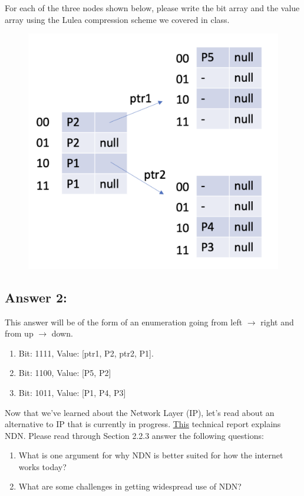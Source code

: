 \documentclass[10pt]{article}
\newenvironment{problem}[2][Problem]{\begin{trivlist}
\item[\hskip \labelsep {\bfseries #1}\hskip \labelsep {\bfseries #2.}]}{\end{trivlist}}
\begin{document}
\begin{problem} {2: Lulea Compression}

For each of the three nodes shown below, please write the bit array and the value array using the Lulea compression scheme we covered in class.

\begin{figure}[h]
    \centering
    \includegraphics[scale=0.5]{figures/trie_nodes.pdf}
    \label{fig:dvp}
\end{figure}

\end{problem}

\subsection*{Answer 2:}
This answer will be of the form of an enumeration going from left $\to$ right and from up $\to$ down.
\begin{enumerate}
    \item Bit: 1111, Value: [ptr1, P2, ptr2, P1].
    \item Bit: 1100, Value: [P5, P2]
    \item Bit: 1011, Value: [P1, P4, P3]
\end{enumerate}

\begin{problem}{3: Reading}
Now that we've learned about the Network Layer (IP), let's read about an alternative to IP that is currently in progress. \href{https://named-data.net/techreport/TR001ndn-proj.pdf}{This} technical report explains NDN. Please read through Section 2.2.3 answer the following questions:
\begin{enumerate}
    \item What is one argument for why NDN is better suited for how the internet works today?
    \item What are some challenges in getting widespread use of NDN?
\end{enumerate}
\end{problem}
\end{document}
